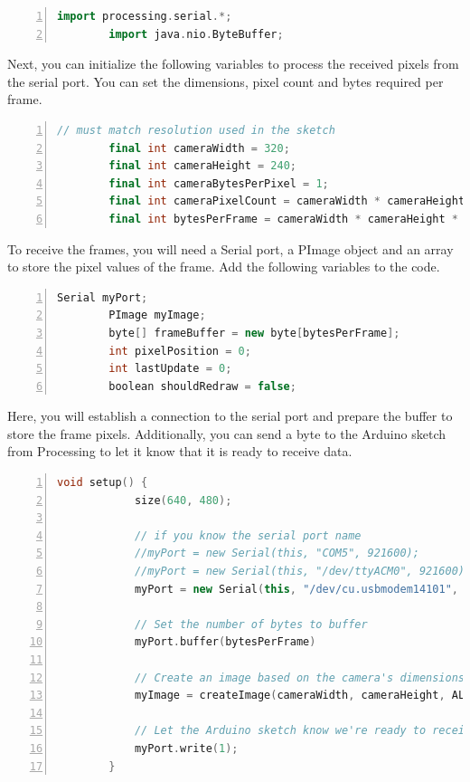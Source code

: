 	\begin{lstlisting}[language=C++, frame=single, numbers=left, basicstyle=\ttfamily\small]
		import processing.serial.*;
		import java.nio.ByteBuffer;
	\end{lstlisting}
	Next, you can initialize the following variables to process the received pixels from the serial port. You can set the dimensions, pixel count and bytes required per frame.
	
	\begin{lstlisting}[language=C++, frame=single, numbers=left, basicstyle=\ttfamily\small]
		// must match resolution used in the sketch
		final int cameraWidth = 320;
		final int cameraHeight = 240;
		final int cameraBytesPerPixel = 1;
		final int cameraPixelCount = cameraWidth * cameraHeight;
		final int bytesPerFrame = cameraWidth * cameraHeight * cameraBytesPerPixel;
	\end{lstlisting}
	
	To receive the frames, you will need a Serial port, a PImage object and an array to store the pixel values of the frame. Add the following variables to the code.
		
	\begin{lstlisting}[language=C++, frame=single, numbers=left, basicstyle=\ttfamily\small]
		Serial myPort;
		PImage myImage;
		byte[] frameBuffer = new byte[bytesPerFrame];
		int pixelPosition = 0;
		int lastUpdate = 0;
		boolean shouldRedraw = false;
	\end{lstlisting}
	Here, you will establish a connection to the serial port and prepare the buffer to store the frame pixels. Additionally, you can send a byte to the Arduino sketch from Processing to let it know that it is ready to receive data.
	
	\begin{lstlisting}[language=C++, frame=single, numbers=left, basicstyle=\ttfamily\small]
		void setup() {
			size(640, 480);
			
			// if you know the serial port name
			//myPort = new Serial(this, "COM5", 921600);                  // Windows
			//myPort = new Serial(this, "/dev/ttyACM0", 921600);          // Linux
			myPort = new Serial(this, "/dev/cu.usbmodem14101", 921600);   // Mac
			
			// Set the number of bytes to buffer 
			myPort.buffer(bytesPerFrame)
			
			// Create an image based on the camera's dimensions and format
			myImage = createImage(cameraWidth, cameraHeight, ALPHA);
			
			// Let the Arduino sketch know we're ready to receive data
			myPort.write(1);
		}
	\end{lstlisting}
	
